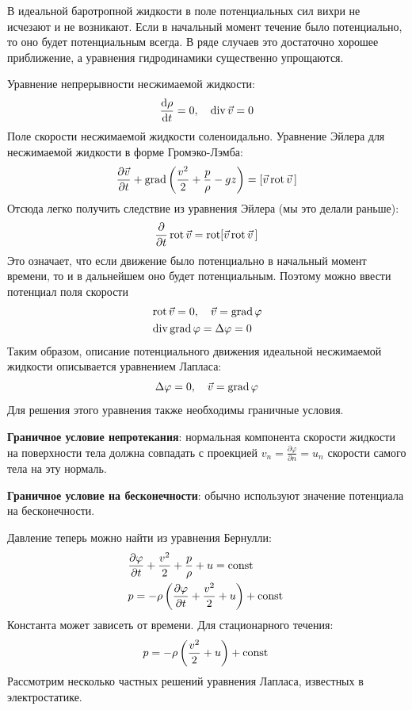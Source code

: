 В идеальной баротропной жидкости в поле потенциальных сил вихри не исчезают и не возникают. Если в начальный момент течение было потенциально, то оно будет потенциальным всегда. В ряде случаев это достаточно хорошее приближение, а уравнения гидродинамики существенно упрощаются. 

Уравнение непрерывности несжимаемой жидкости:
\begin{align*}
\frac { \dd \rho } { \dd t } = 0 ,\quad \operatorname{div} \vec{v} = 0
\end{align*}
Поле скорости несжимаемой жидкости соленоидально. Уравнение Эйлера для несжимаемой жидкости в форме Громэко-Лэмба:
\begin{align*}
\pdv{\vec{v}}{t} + \operatorname{grad}\qty(\frac{v^2}{2}+\frac{p}{\rho}-gz) = [\vec{v} \operatorname{rot}\vec{v}\,]
\end{align*}
Отсюда легко получить следствие из уравнения Эйлера (мы это делали раньше):
\begin{align*}
\pdv{t}\operatorname{rot}\vec{v} =\operatorname{rot}[ \vec{v}\operatorname{rot}\vec{v}  \, ]
\end{align*}
Это означает, что если движение было потенциально в начальный момент времени, то и в дальнейшем оно будет потенциальным. Поэтому можно ввести потенциал поля скорости
\begin{align*}
 &\operatorname{rot} \vec{v} = 0 , \quad  { \vec{v} =\operatorname{grad}\varphi } \\  
 &\operatorname { div\, grad } \varphi = \Delta \varphi = 0 
\end{align*}
Таким образом, описание потенциального движения идеальной несжимаемой жидкости описывается уравнением Лапласа:
\begin{align*}
\Delta \varphi = 0 , \quad \vec{v} =\operatorname{grad} \varphi
\end{align*}
Для решения этого уравнения также необходимы граничные условия.

\textbf{Граничное условие непротекания}: нормальная компонента скорости жидкости на поверхности тела должна совпадать с проекцией $v_n=\frac { \partial \varphi } { \partial n }=u_n$ скорости самого тела на эту нормаль. 

\textbf{Граничное условие на бесконечности}: обычно используют значение потенциала на бесконечности.

Давление теперь можно найти из уравнения Бернулли:
\begin{align*}
& \frac { \partial \varphi } { \partial t } + \frac { v ^ { 2 } } { 2 } + \frac { p } { \rho } + u =  \mathrm{const}\,  \\
& p = - \rho\left( \frac { \partial \varphi } { \partial t } + \frac { v ^ { 2 } } { 2 } + u \right) +  \mathrm{const}\, 
\end{align*}
Константа может зависеть от времени. Для стационарного течения:
\begin{align*}
p = - \rho\left( \frac { v ^ { 2 } } { 2 } + u \right) +  \mathrm{const}\, 
\end{align*}
Рассмотрим несколько частных решений уравнения Лапласа, известных в  электростатике.

